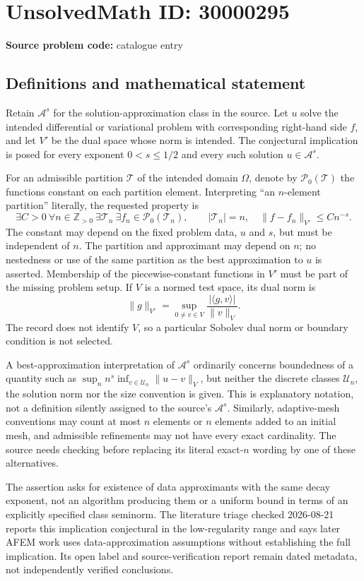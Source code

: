 \documentclass[11pt]{article}
\newcommand{\Z}{\mathbb{Z}}
\begin{document}
\section*{UnsolvedMath ID: 30000295}
\textbf{Source problem code:} catalogue entry
\subsection{Definitions and mathematical statement}
Retain \(\mathcal A^s\) for the solution-approximation class in the source. Let \(u\) solve the intended differential or variational problem with corresponding right-hand side \(f\), and let \(V'\) be the dual space whose norm is intended. The conjectural implication is posed for every exponent \(0<s\leq1/2\) and every such solution \(u\in\mathcal A^s\).

For an admissible partition \(\mathcal T\) of the intended domain \(\Omega\), denote by \(\mathcal P_0(\mathcal T)\) the functions constant on each partition element. Interpreting ``an \(n\)-element partition'' literally, the requested property is
\[
 \exists C>0\ \forall n\in\Z_{>0}\ \exists\mathcal T_n\ \exists f_n\in\mathcal P_0(\mathcal T_n),\qquad
 |\mathcal T_n|=n,\quad\|f-f_n\|_{V'}\leq Cn^{-s}.
\]
The constant may depend on the fixed problem data, \(u\) and \(s\), but must be independent of \(n\). The partition and approximant may depend on \(n\); no nestedness or use of the same partition as the best approximation to \(u\) is asserted. Membership of the piecewise-constant functions in \(V'\) must be part of the missing problem setup. If \(V\) is a normed test space, its dual norm is
\[
 \|g\|_{V'}=\sup_{0\ne v\in V}\frac{|\langle g,v\rangle|}{\|v\|_V}.
\]
The record does not identify \(V\), so a particular Sobolev dual norm or boundary condition is not selected.

A best-approximation interpretation of \(\mathcal A^s\) ordinarily concerns boundedness of a quantity such as \(\sup_n n^s\inf_{v\in\mathcal U_n}\|u-v\|_V\), but neither the discrete classes \(\mathcal U_n\), the solution norm nor the size convention is given. This is explanatory notation, not a definition silently assigned to the source's \(\mathcal A^s\). Similarly, adaptive-mesh conventions may count at most \(n\) elements or \(n\) elements added to an initial mesh, and admissible refinements may not have every exact cardinality. The source needs checking before replacing its literal exact-\(n\) wording by one of these alternatives.

The assertion asks for existence of data approximants with the same decay exponent, not an algorithm producing them or a uniform bound in terms of an explicitly specified class seminorm. The literature triage checked 2026-08-21 reports this implication conjectural in the low-regularity range and says later AFEM work uses data-approximation assumptions without establishing the full implication. Its open label and source-verification report remain dated metadata, not independently verified conclusions.
\end{document}
